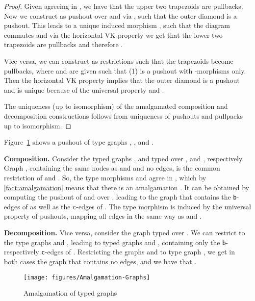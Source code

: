 \begin{proof}
Given  agreeing in , we have that the upper two trapezoids are pullbacks. Now we construct  as pushout over  and  via , such that the outer diamond is a pushout. This leads to a unique induced morphism , such that the diagram commutes and via the horizontal VK property we get that the lower two trapezoids are pullbacks and therefore .

Vice versa, we can construct  as restrictions such that the trapezoids become pullbacks, where  and  are given such that (1) is a pushout with \M-morphisms only. Then the horizontal VK property implies that the outer diamond is a pushout and  is unique because of the universal property and .

The uniqueness (up to isomorphism) of the amalgamated composition and decomposition constructions follows from uniqueness of pushouts
and pullpacks up to isomorphism.
\end{proof}

\begin{example}\label{ex:amalgamation-objects}
	Figure~\ref{fig:amalgamation-objects} shows a pushout of type graphs , ,  and . 
	\begin{description}
		\item \textbf{Composition.}
			Consider the typed graphs ,  and  typed over ,  and , respectively. Graph , containing 
			the same nodes as  and  and no edges, is the common restriction of  and . So, the type morphisms  and 
			agree in , which by \autoref{fact:amalgamation} means that there is an amalgamation . It can be obtained
			by computing the pushout of  and  over , leading to the graph  that contains the \texttt{b}-edges of  as well
			as the \texttt{c}-edges of . The type morphism  is induced by the universal property of pushouts, mapping all edges
			in the same way as  and .
		\item \textbf{Decomposition.}
			Vice versa, consider the graph  typed over . We can restrict  to the type graphs  and , leading
			to typed graphs  and , containing only the \texttt{b}- respectively \texttt{c}-edges of . Restricting the graphs
			 and  to type graph , we get in both cases the graph  that contains no edges, and we have that .
	\end{description}
	
	\begin{figure}[htb]\centering
	\texttt{[image: figures/Amalgamation-Graphs]}
	\caption{Amalgamation of typed graphs}\label{fig:amalgamation-objects}
	\end{figure}
\end{example}


